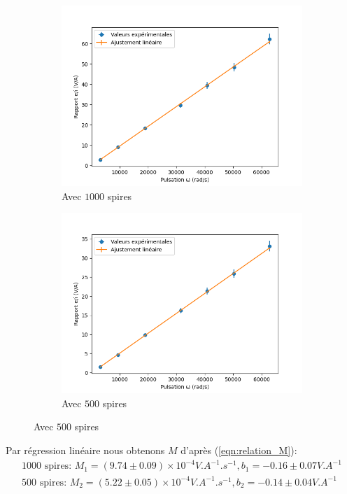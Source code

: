 \documentclass[11pt]{article}
\begin{document}
\begin{figure}[h!]
    \centering
    \begin{subfigure}{.5\textwidth}
      \centering
        \includegraphics[width=.95\linewidth]{img/Graph_1000spires.png}
      \caption{Avec $1000$ spires}
      \label{fig:sfig1}
    \end{subfigure}%
    \begin{subfigure}{.5\textwidth}
      \centering
      \includegraphics[width=.95\linewidth]{img/Graph_500spires.png}
      \caption{Avec $500$ spires}
      \label{fig:sfig2}
    \end{subfigure}
\end{figure}

Par régression linéaire nous obtenons $M$ d'après (\ref{eqn:relation_M}):
\begin{align}
    \text{1000 spires: } M_1 = (9.74 \pm 0.09) \times 10^{-4} V.A^{-1}.s^{-1}, b_1 = -0.16 \pm 0.07 V.A^{-1} \\
    \text{500 spires: } M_2 = (5.22 \pm 0.05) \times 10^{-4} V.A^{-1}.s^{-1}, b_2 = -0.14 \pm 0.04 V.A^{-1}
\end{align}
\end{document}
